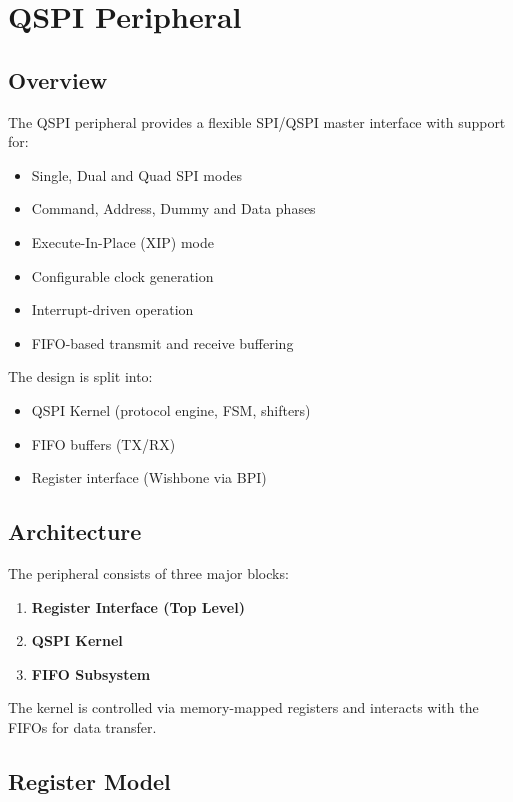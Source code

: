 \section{QSPI Peripheral}

\subsection{Overview}

The QSPI peripheral provides a flexible SPI/QSPI master interface with support for:
\begin{itemize}
  \item Single, Dual and Quad SPI modes
  \item Command, Address, Dummy and Data phases
  \item Execute-In-Place (XIP) mode
  \item Configurable clock generation
  \item Interrupt-driven operation
  \item FIFO-based transmit and receive buffering
\end{itemize}

The design is split into:
\begin{itemize}
  \item QSPI Kernel (protocol engine, FSM, shifters)
  \item FIFO buffers (TX/RX)
  \item Register interface (Wishbone via BPI)
\end{itemize}

\subsection{Architecture}

The peripheral consists of three major blocks:

\begin{enumerate}
  \item \textbf{Register Interface (Top Level)}
  \item \textbf{QSPI Kernel}
  \item \textbf{FIFO Subsystem}
\end{enumerate}

The kernel is controlled via memory-mapped registers and interacts with the FIFOs for data transfer.

\subsection{Register Model}

